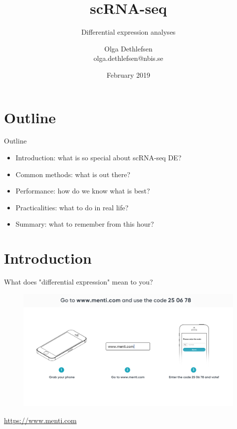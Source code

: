 \documentclass{beamer}\usepackage[]{graphicx}\usepackage[]{color}
\title[scRNA-seq DE]{scRNA-seq}
\subtitle{Differential expression analyses}
\author[Olga]{Olga Dethlefsen\\{\scriptsize olga.dethlefsen@nbis.se}}
\institute[NBIS]{NBIS, National Bioinformatics Infrastructure Sweden\\}
\date[February 2019]{February 2019}
\begin{document}
\begin{frame}
\titlepage
\end{frame}

\logo{}

\section{Outline}
\begin{frame}
\begin{block}{Outline}
\begin{itemize}  \pause
  \item Introduction: what is so special about scRNA-seq DE? \pause
  \item Common methods: what is out there? \pause
  \item Performance: how do we know what is best? \pause
  \item Practicalities: what to do in real life? \pause
  \item Summary: what to remember from this hour? 
 \end{itemize}
\end{block}
\end{frame}

\section{Introduction}
\begin{frame}
\begin{center}
\insertsection
\end{center}
\end{frame}

\begin{frame}
\begin{center}
What does "differential expression" mean to you?
\begin{figure}
\includegraphics[width=12cm]{Images/menti.png}
\end{figure}
\href{https://www.menti.com}{https://www.menti.com}
\end{center}
\end{frame}
\end{document}
